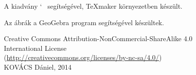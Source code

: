 
\newpage
\thispagestyle{empty}
\null\vfill
\begin{center}
  A kiadv\'{a}ny \AmS{}`~\LaTeXe{} seg\'{i}ts\'{e}g\'{e}vel, \TeX{}maker
  k\"{o}rnyezetben k\'{e}sz\"{u}lt.
	
  Az \'{a}br\'{a}k a GeoGebra program seg\'{i}ts\'{e}g\'{e}vel
  k\'{e}sz\"{u}ltek.\\[4ex]	
	
  {\Large\cc\byncsa}
  
  Creative Commons Attribution-NonCommercial-ShareAlike 4.0\\
  International License\\
  (\url{http://creativecommons.org/licenses/by-nc-sa/4.0/})\\[4ex]
  
  KOV\'{A}CS D\'{a}niel, 2014
\end{center} 